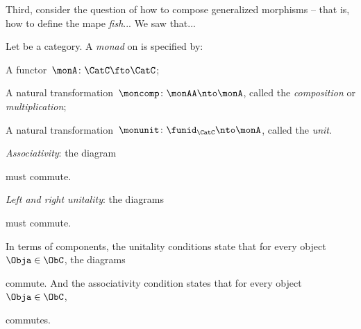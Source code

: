 Third, consider the question of how to compose generalized morphisms -- that is, how to define the mape \emph{fish}... We saw that...

\begin{ctdefinition}[Monad]
  \label{def:monad}
  Let \CatC be a category. A \emph{monad} on \CatC is specified by:\\
  \constit
  \begin{compactenum}
    \item A functor~$ \monA \colon \CatC \fto \CatC$;
    \item A natural transformation~$\moncomp \colon \monAA \nto \monA$, called the \emph{composition} or \emph{multiplication};
    \item A natural transformation~$\monunit \colon \funid_\CatC \nto \monA$, called the \emph{unit}.
  \end{compactenum}
  \condit
  \begin{compactenum}
    \item \emph{Associativity}: the diagram
  \begin{center}\label{eq:monad-associativity}
  \end{center}
  must commute.
 \item \emph{Left and right unitality}: the diagrams
  \begin{center}\label{eq:monad-unitality}
  \end{center}
  must commute.
  \end{compactenum}
\end{ctdefinition}

\begin{remark}\label{rem:monad-condition-components}
In terms of components, the unitality conditions state that for every object~$\Obja \in \ObC$, the diagrams

\begin{center}
\end{center}


commute. And the associativity condition states that for every object~$\Obja \in \ObC$,

\begin{center}
\end{center}

commutes.
\end{remark}



